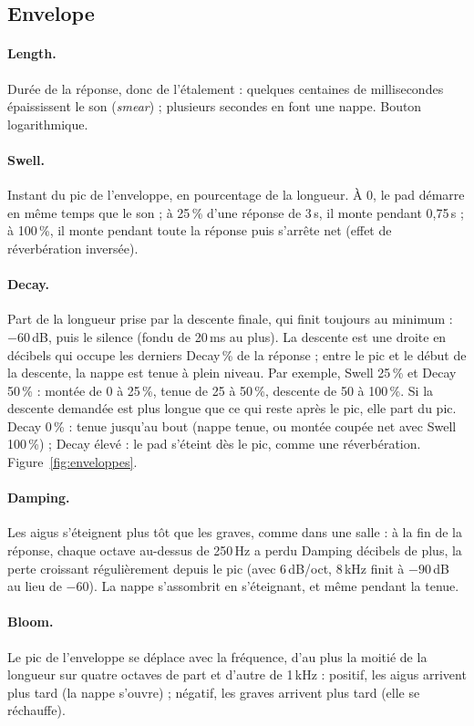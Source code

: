 \documentclass[a4paper,11pt]{article}
\newcommand{\dB}{\,dB}
\begin{document}
\subsection{Envelope}

\paragraph{Length.} Durée de la réponse, donc de l'étalement : quelques centaines de millisecondes
épaississent le son (\emph{smear}) ; plusieurs secondes en font une nappe. Bouton logarithmique.

\paragraph{Swell.} Instant du pic de l'enveloppe, en pourcentage de la longueur. À 0, le pad démarre
en même temps que le son ; à 25\,\% d'une réponse de 3\,s, il monte pendant 0,75\,s ; à 100\,\%, il
monte pendant toute la réponse puis s'arrête net (effet de \og réverbération inversée\fg).

\paragraph{Decay.} Part de la longueur prise par la descente finale, qui finit toujours au
minimum : $-60$\dB, puis le silence (fondu de 20\,ms au plus). La descente est une droite en
décibels qui occupe les derniers Decay\,\% de la réponse ; entre le pic et le début de la descente,
la nappe est tenue à plein niveau. Par exemple, Swell 25\,\% et Decay 50\,\% : montée de 0 à 25\,\%,
tenue de 25 à 50\,\%, descente de 50 à 100\,\%. Si la descente demandée est plus longue que ce qui
reste après le pic, elle part du pic. Decay 0\,\% : tenue jusqu'au bout (nappe tenue, ou montée
coupée net avec Swell 100\,\%) ; Decay élevé : le pad s'éteint dès le pic, comme une
réverbération. Figure~\ref{fig:enveloppes}.

\paragraph{Damping.} Les aigus s'éteignent plus tôt que les graves, comme dans une salle : à la fin
de la réponse, chaque octave au-dessus de 250\,Hz a perdu Damping décibels de plus, la perte
croissant régulièrement depuis le pic (avec 6\dB/oct, 8\,kHz finit à $-90$\dB{} au lieu de
$-60$). La nappe s'assombrit en s'éteignant, et même pendant la tenue.

\paragraph{Bloom.} Le pic de l'enveloppe se déplace avec la fréquence, d'au plus la moitié de la
longueur sur quatre octaves de part et d'autre de 1\,kHz : positif, les aigus arrivent plus tard
(la nappe s'ouvre) ; négatif, les graves arrivent plus tard (elle se réchauffe).
\end{document}
